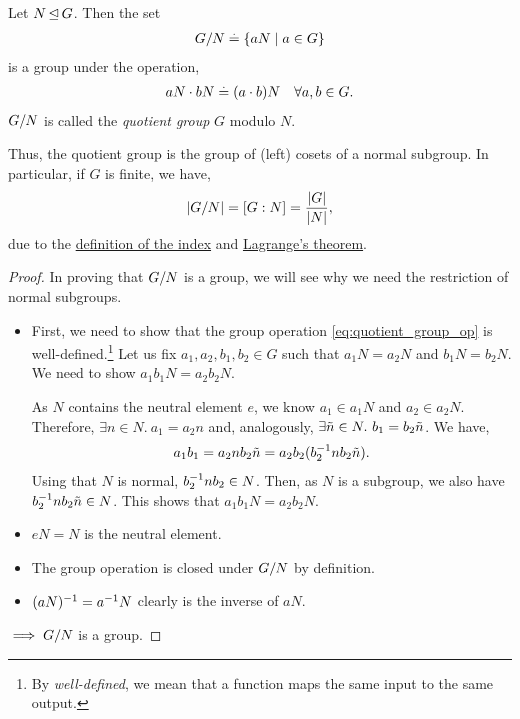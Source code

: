 \begin{thm}\label{thm:quotient_group}
Let $N \operatorname*{\trianglelefteq} G$. Then the set \begin{align}
    G/N \overset{.}{=} \{a N \mid a \in G\}
\end{align} is a group under the operation, \begin{align}
    a N \cdot b N \overset{.}{=} (a \cdot b) N \quad \forall a, b \in G. \label{eq:quotient_group_op}
\end{align} $G/N$ is called the \emph{quotient group} $G$ modulo $N$.
\end{thm} Thus, the quotient group is the group of (left) cosets of a normal subgroup. In particular, if $G$ is finite, we have, \begin{align}
    |G/N| = [G:N] = \frac{|G|}{|N|},
\end{align} due to the \hyperref[defn:index]{definition of the index} and \hyperref[thm"lagrange]{Lagrange's theorem}. \begin{proof}
In proving that $G/N$ is a group, we will see why we need the restriction of normal subgroups.

\begin{itemize}
    \item First, we need to show that the group operation \eqref{eq:quotient_group_op} is well-defined.\footnote{By \emph{well-defined}, we mean that a function maps the same input to the same output.} Let us fix $a_1, a_2, b_1, b_2 \in G$ such that $a_1 N = a_2 N$ and $b_1 N = b_2 N$. We need to show $a_1 b_1 N = a_2 b_2 N$.
    
    As $N$ contains the neutral element $e$, we know $a_1 \in a_1 N$ and $a_2 \in a_2 N$. Therefore, $\exists n \in N.\ a_1 = a_2 n$ and, analogously, $\exists \Tilde{n} \in N.\ b_1 = b_2 \Tilde{n}$. We have, \begin{align*}
        a_1 b_1 = a_2 n b_2 \Tilde{n} = a_2 b_2 (b_2^{-1} n b_2 \Tilde{n}).
    \end{align*} Using that $N$ is normal, $b_2^{-1} n b_2 \in N$. Then, as $N$ is a subgroup, we also have $b_2^{-1} n b_2 \Tilde{n} \in N$. This shows that $a_1 b_1 N = a_2 b_2 N$.
    \item $e N = N$ is the neutral element.
    \item The group operation is closed under $G/N$ by definition.
    \item $(a N)^{-1} = a^{-1} N$ clearly is the inverse of $a N$.
\end{itemize} $\implies G/N$ is a group.
\end{proof}

